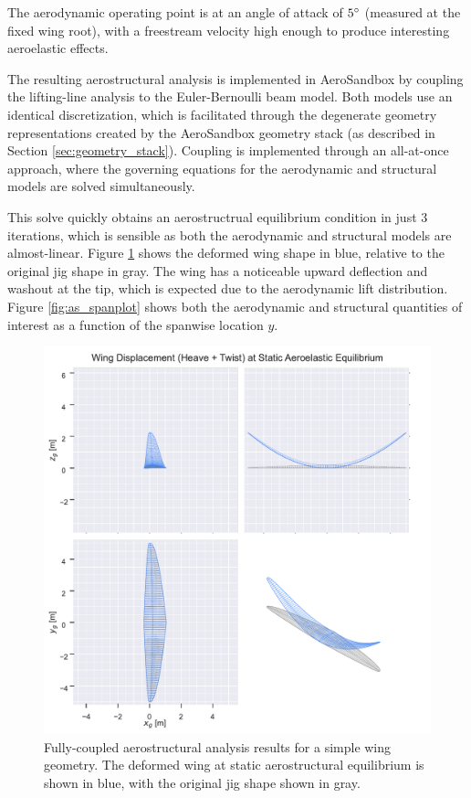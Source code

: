 The aerodynamic operating point is at an angle of attack of $5\degree$ (measured at the fixed wing root), with a freestream velocity high enough to produce interesting aeroelastic effects.

The resulting aerostructural analysis is implemented in AeroSandbox by coupling the lifting-line analysis to the Euler-Bernoulli beam model. Both models use an identical discretization, which is facilitated through the degenerate geometry representations created by the AeroSandbox geometry stack (as described in Section \ref{sec:geometry_stack}). Coupling is implemented through an all-at-once approach, where the governing equations for the aerodynamic and structural models are solved simultaneously.

This solve quickly obtains an aerostructrual equilibrium condition in just 3 iterations, which is sensible as both the aerodynamic and structural models are almost-linear. Figure \ref{fig:as_deformation} shows the deformed wing shape in blue, relative to the original jig shape in gray. The wing has a noticeable upward deflection and washout at the tip, which is expected due to the aerodynamic lift distribution. Figure \ref{fig:as_spanplot} shows both the aerodynamic and structural quantities of interest as a function of the spanwise location $y$.

\begin{figure}[h]
    \centering
    \includegraphics[width=\textwidth]{../figures/aerostructural/deformation.pdf}
    \caption{Fully-coupled aerostructural analysis results for a simple wing geometry. The deformed wing at static aerostructural equilibrium is shown in blue, with the original jig shape shown in gray.}
    \label{fig:as_deformation}
\end{figure}

